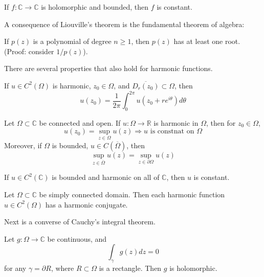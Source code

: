 \documentclass[openany]{book}
\newcommand{\R}{\mathbb{R}}
\newcommand{\C}{\mathbb{C}}
\begin{document}
\begin{thm}
    If $f:\C\to\C$ is holomorphic and bounded, then $f$ is constant.
\end{thm}

A consequence of Liouville's theorem is the fundamental theorem of algebra:
\begin{prop}
    If $p(z)$ is a polynomial of degree $n\geq 1$, then $p(z)$ has at least one root. (Proof: consider $1/p(z)$).
\end{prop}

There are several properties that also hold for harmonic functions.
\begin{prop}
    If $u\in C^2(\Omega)$ is harmonic, $z_0\in\Omega$, and $\overline{D_r(z_0)}\subset\Omega$, then 
    \begin{equation*}
        u(z_0)=\frac{1}{2\pi}\int_0^{2\pi}u(z_0+re^{i\theta})d\theta
    \end{equation*}
\end{prop}


\begin{prop}
    Let $\Omega\subset\C$ be connected and open. If $u:\Omega\to\R$ is harmonic in $\Omega$, then for $z_0\in\Omega$,
    \begin{equation*}
        u(z_0)=\sup_{z\in\Omega}u(z)\Rightarrow u \text{ is constnat on $\Omega$}
    \end{equation*}
    Moreover, if $\Omega$ is bounded, $u\in C(\overline{\Omega})$, then 
    \begin{equation*}
        \sup_{z\in\overline{\Omega}}u(z)=\sup_{z\in\partial\Omega}u(z)
    \end{equation*}
\end{prop}

\begin{prop}
    If $u\in C^2(\C)$ is bounded and harmonic on all of $\C$, then $u$ is constant.
\end{prop}

\begin{prop}
    Let $\Omega\subset\C$ be simply connected domain. Then each harmonic function $u\in C^2(\Omega)$ has a harmonic conjugate.
\end{prop}

Next is a converse of Cauchy's integral theorem.
\begin{thm}
    Let $g:\Omega\to\C$ be continuous, and 
    \begin{equation*}
        \int_\gamma g(z)dz=0
    \end{equation*}
    for any $\gamma=\partial R$, where $R\subset\Omega$ is a rectangle. Then $g$ is holomorphic.
\end{thm}
\end{document}
